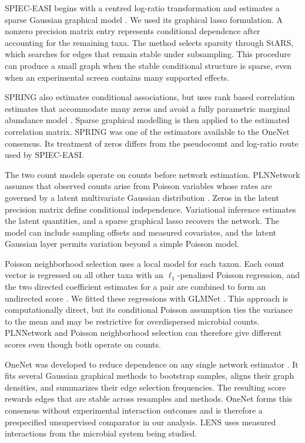 \documentclass[11pt]{article}
\begin{document}
SPIEC-EASI begins with a centred log-ratio transformation and estimates a sparse Gaussian graphical model \citep{kurtz2015spieceasi}.
We used its graphical lasso formulation.
A nonzero precision matrix entry represents conditional dependence after accounting for the remaining taxa.
The method selects sparsity through StARS, which searches for edges that remain stable under subsampling.
This procedure can produce a small graph when the stable conditional structure is sparse, even when an experimental screen contains many supported effects.

SPRING also estimates conditional associations, but uses rank based correlation estimates that accommodate many zeros and avoid a fully parametric marginal abundance model \citep{yoon2019spring}.
Sparse graphical modelling is then applied to the estimated correlation matrix.
SPRING was one of the estimators available to the OneNet consensus.
Its treatment of zeros differs from the pseudocount and log-ratio route used by SPIEC-EASI.

The two count models operate on counts before network estimation.
PLNNetwork assumes that observed counts arise from Poisson variables whose rates are governed by a latent multivariate Gaussian distribution \citep{chiquet2019pln}.
Zeros in the latent precision matrix define conditional independence.
Variational inference estimates the latent quantities, and a sparse graphical lasso recovers the network.
The model can include sampling offsets and measured covariates, and the latent Gaussian layer permits variation beyond a simple Poisson model.

Poisson neighborhood selection uses a local model for each taxon.
Each count vector is regressed on all other taxa with an $\ell_1$-penalized Poisson regression, and the two directed coefficient estimates for a pair are combined to form an undirected score \citep{allen2013poisson}.
We fitted these regressions with GLMNet \citep{friedman2010glmnet}.
This approach is computationally direct, but its conditional Poisson assumption ties the variance to the mean and may be restrictive for overdispersed microbial counts.
PLNNetwork and Poisson neighborhood selection can therefore give different scores even though both operate on counts.

OneNet was developed to reduce dependence on any single network estimator \citep{champion2024onenet}.
It fits several Gaussian graphical methods to bootstrap samples, aligns their graph densities, and summarizes their edge selection frequencies.
The resulting score rewards edges that are stable across resamples and methods.
OneNet forms this consensus without experimental interaction outcomes and is therefore a prespecified unsupervised comparator in our analysis.
LENS uses measured interactions from the microbial system being studied.
\end{document}
